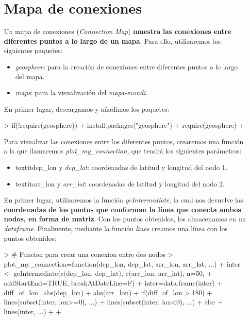 \documentclass [a4paper] {article}
\begin{document}
\section{Mapa de conexiones}
Un mapa de conexiones (\textit{Connection Map}) \textbf{muestra las conexiones entre diferentes puntos a lo largo de un mapa}. Para ello, utilizaremos los siguientes paquetes:
\begin{itemize}
  \item \textit{geosphere}: para la creación de conexiones entre diferentes puntos a lo largo del mapa.
  \item \textit{maps}: para la visualización del \textit{mapa-mundi}.
\end{itemize}
En primer lugar, descargamos y añadimos los paquetes:
\begin{Schunk}
\begin{Sinput}
> if(!require(geosphere)){
+   install.packages("geosphere")
+   require(geosphere)
+ }
\end{Sinput}
\end{Schunk}
Para visualizar las conexiones entre los diferentes puntos, crearemos una función a la que llamaremos \textit{plot\_my\_connection}, que tendrá los siguientes parámetros:
\begin{itemize}
  \item textit{dep\_lon} y \textit{dep\_lat}: coordenadas de latitud y longitud del nodo 1.
  \item textit{arr\_lon} y \textit{arr\_lat}: coordenadas de latitud y longitud del nodo 2.
\end{itemize}

En primer lugar, utilizaremos la función \textit{gcIntermediate}, la cual nos devuelve las \textbf{coordenadas de los puntos que conforman la línea que conecta ambos nodos, en forma de matriz}. Con los puntos obtenidos, los almacenamos en un \textit{dataframe}. Finalmente, mediante la función \textit{lines} creamos una línea con los puntos obtenidos:
\begin{Schunk}
\begin{Sinput}
> # Funcion para crear una conexion entre dos nodos
> plot_my_connection=function(dep_lon, dep_lat, arr_lon, arr_lat, ...){
+     inter <- gcIntermediate(c(dep_lon, dep_lat), c(arr_lon, arr_lat), n=50, 
+     addStartEnd=TRUE, breakAtDateLine=F)             
+     inter=data.frame(inter)
+     diff_of_lon=abs(dep_lon) + abs(arr_lon)
+     if(diff_of_lon > 180){
+         lines(subset(inter, lon>=0), ...)
+         lines(subset(inter, lon<0), ...)
+     }else{
+         lines(inter, ...)
+         }
+     }
\end{Sinput}
\end{Schunk}
\end{document}
